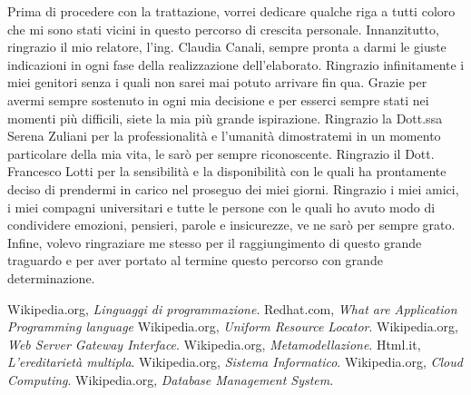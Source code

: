 \documentclass[corpo=13pt,numerazioneromana]{toptesi}
\makeatletter
\newcommand\listofcodes{%
 \iffrontmatter\else\frontmattertrue\fi
 \if@openright\cleardoublepage\else\clearpage\fi
 \begingroup\def\chapter##1{\@schapter}
 \phantomsection %
 \addcontentsline{toc}{chapter}{Elenco dei listati}
 \lstlistoflistings
 \endgroup
}
\makeatother
\begin{document}
\ringraziamenti
Prima di procedere con la trattazione, vorrei dedicare qualche riga a tutti coloro che mi sono stati vicini in questo percorso di crescita personale.
Innanzitutto, ringrazio il mio relatore, l'ing. Claudia Canali, sempre pronta a darmi le giuste indicazioni in ogni fase della realizzazione dell’elaborato. Ringrazio infinitamente i miei genitori senza i quali non sarei mai potuto arrivare fin qua. Grazie per avermi sempre sostenuto in ogni mia decisione e per esserci sempre stati nei momenti più difficili, siete la mia più grande ispirazione. Ringrazio la Dott.ssa Serena Zuliani per la professionalità e l'umanità dimostratemi in un momento particolare della mia vita, le sarò per sempre riconoscente. Ringrazio il Dott. Francesco Lotti per la sensibilità e la disponibilità con le quali ha prontamente deciso di prendermi in carico nel proseguo dei miei giorni. Ringrazio i miei amici, i miei compagni universitari e tutte le persone con le quali ho avuto modo di condividere emozioni, pensieri, parole e insicurezze, ve ne sarò per sempre grato. Infine, volevo ringraziare me stesso per il raggiungimento di questo grande traguardo e per aver portato al termine questo percorso con grande determinazione.



\tableofcontents

\listoffigures



\mainmatter










\begin{thebibliography}{9}
\bibitem{}
        Wikipedia.org,
        \textit{Linguaggi di programmazione}.
        \hfill\break
    \bibitem{}
        Redhat.com,
        \textit{What are Application Programming language}
        \hfill\break
    \bibitem{}
        Wikipedia.org,
        \textit{Uniform Resource Locator}.
        \hfill\break
    \bibitem{}
        Wikipedia.org,
        \textit{Web Server Gateway Interface}.
        \hfill\break
    \bibitem{}
        Wikipedia.org,
        \textit{Metamodellazione}.
        \hfill\break
    \bibitem{}
        Html.it,
        \textit{L'ereditarietà multipla}.
        \hfill\break
    \bibitem{}
        Wikipedia.org,
        \textit{Sistema Informatico}.
        \hfill\break
    \bibitem{}
        Wikipedia.org,
        \textit{Cloud Computing}.
        \hfill\break
    \bibitem{}
        Wikipedia.org,
        \textit{Database Management System}.

\end{thebibliography}
\end{document}

